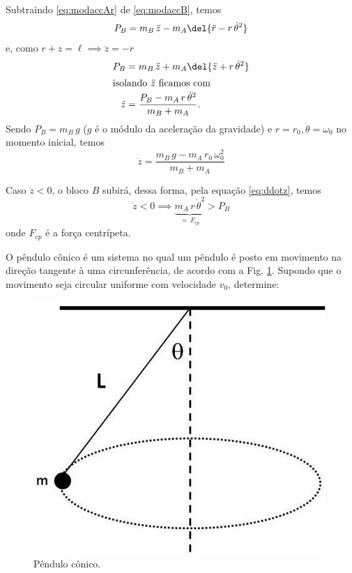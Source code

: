 \documentclass[]{IMTexam}
\begin{document}
\begin{questions}
\begin{solution}
		Subtraindo \ref{eq:modaccAr} de \ref{eq:modaccB}, temos
		\[ P_B=m_B\,\ddot{z}-m_A\del{\ddot{r}-r\,\dot{\theta}^{2}} \]
		e, como $ r+z=\ell\implies \ddot{z}=-\ddot{r} $
		\begin{align}
			P_B      & =m_B\,\ddot{z}+m_A\del{\ddot{z}+r\,\dot{\theta}^{2}}\nonumber   \\
			\intertext{isolando $ \ddot{z} $ ficamos com}
			\ddot{z} & =\dfrac{P_B-m_A\,r\,\dot{\theta}^{2}}{m_B+m_A}.\label{eq:ddotz}
		\end{align}
		Sendo $ P_B=m_B\,g $ ($ g $ é o módulo da aceleração da gravidade) e $ r=r_0,\dot{\theta}=\omega_0 $ no momento inicial, temos
		\[ \ddot{z}=\dfrac{m_B\,g-m_A\,r_0\,\omega_0^{2}}{m_B+m_A} \]
		\begin{unindent}

			\item Caso $ \ddot{z}<0 $, o bloco $ B $ subirá, dessa forma, pela equação \ref{eq:ddotz}, temos
			\[ \ddot{z}<0\implies \underbrace{m_A\,r\,\dot{\theta}^{2}}_{=\,F_{cp}}>P_B \]
			onde $ F_{cp} $ é a força centrípeta.
		\end{unindent}
	\end{solution}



	\question O pêndulo cônico é um sistema no qual um pêndulo é posto em movimento na direção tangente à uma circunferência, de acordo com a Fig. \ref{fig:fig3}. Supondo que o movimento seja circular uniforme com velocidade $ v_0 $, determine:

	\begin{figure}[H]
		\centering
		\includegraphics[width=0.4\linewidth]{screenshot003}
		\caption{Pêndulo cônico.}
		\label{fig:fig3}
	\end{figure}

\end{questions}
\end{document}
